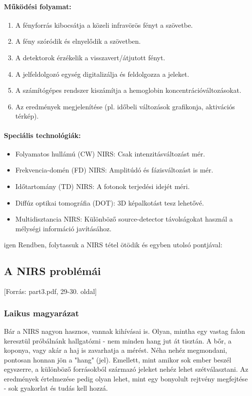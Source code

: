 \documentclass[a4paper,12pt]{article}
\begin{document}
\paragraph{Működési folyamat:} \begin{enumerate} \item A fényforrás kibocsátja a közeli infravörös fényt a szövetbe. \item A fény szóródik és elnyelődik a szövetben. \item A detektorok érzékelik a visszavert/átjutott fényt. \item A jelfeldolgozó egység digitalizálja és feldolgozza a jeleket. \item A számítógépes rendszer kiszámítja a hemoglobin koncentrációváltozásokat. \item Az eredmények megjelenítése (pl. időbeli változások grafikonja, aktivációs térkép). \end{enumerate}

\paragraph{Speciális technológiák:} \begin{itemize} \item Folyamatos hullámú (CW) NIRS: Csak intenzitásváltozást mér. \item Frekvencia-domén (FD) NIRS: Amplitúdó és fázisváltozást is mér. \item Időtartomány (TD) NIRS: A fotonok terjedési idejét méri. \item Diffúz optikai tomográfia (DOT): 3D képalkotást tesz lehetővé. \item Multidisztancia NIRS: Különböző source-detector távolságokat használ a mélységi információ javításához. \end{itemize}

igen
Rendben, folytassuk a NIRS tétel ötödik és egyben utolsó pontjával:

\subsection{A NIRS problémái} [Forrás: part3.pdf, 29-30. oldal]

\subsubsection{Laikus magyarázat} Bár a NIRS nagyon hasznos, vannak kihívásai is. Olyan, mintha egy vastag falon keresztül próbálnánk hallgatózni - nem minden hang jut át tisztán. A bőr, a koponya, vagy akár a haj is zavarhatja a mérést. Néha nehéz megmondani, pontosan honnan jön a "hang" (jel). Emellett, mint amikor sok ember beszél egyszerre, a különböző forrásokból származó jeleket nehéz lehet szétválasztani. Az eredmények értelmezése pedig olyan lehet, mint egy bonyolult rejtvény megfejtése - sok gyakorlat és tudás kell hozzá.
\end{document}
